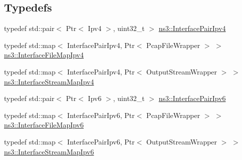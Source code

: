 \subsection*{Typedefs}
\begin{DoxyCompactItemize}
\item 
typedef std\+::pair$<$ Ptr$<$ Ipv4 $>$, uint32\+\_\+t $>$ \hyperlink{namespacens3_a83e2603870381affabd5ca766d17daff}{ns3\+::\+Interface\+Pair\+Ipv4}
\item 
typedef std\+::map$<$ Interface\+Pair\+Ipv4, Ptr$<$ Pcap\+File\+Wrapper $>$ $>$ \hyperlink{namespacens3_ab14a5629528234e6f76ad3bb180022fe}{ns3\+::\+Interface\+File\+Map\+Ipv4}
\item 
typedef std\+::map$<$ Interface\+Pair\+Ipv4, Ptr$<$ Output\+Stream\+Wrapper $>$ $>$ \hyperlink{namespacens3_a5634ac4e27d952132fba4cd906d4ebd3}{ns3\+::\+Interface\+Stream\+Map\+Ipv4}
\item 
typedef std\+::pair$<$ Ptr$<$ Ipv6 $>$, uint32\+\_\+t $>$ \hyperlink{namespacens3_a0b8af63c51db067046898676b69ff182}{ns3\+::\+Interface\+Pair\+Ipv6}
\item 
typedef std\+::map$<$ Interface\+Pair\+Ipv6, Ptr$<$ Pcap\+File\+Wrapper $>$ $>$ \hyperlink{namespacens3_a813e647fd662cd1cb49971557c079f7e}{ns3\+::\+Interface\+File\+Map\+Ipv6}
\item 
typedef std\+::map$<$ Interface\+Pair\+Ipv6, Ptr$<$ Output\+Stream\+Wrapper $>$ $>$ \hyperlink{namespacens3_a6d5ce37129f3e74cffc79483d67ff82e}{ns3\+::\+Interface\+Stream\+Map\+Ipv6}
\end{DoxyCompactItemize}
